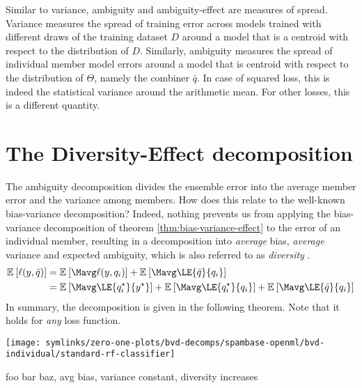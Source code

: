 \documentclass[../main.tex]{subfiles}
\begin{document}
Similar to variance, ambiguity and ambiguity-effect are measures of spread. 
Variance measures the spread of training error across models trained with different draws of the training dataset $D$ around a model that is a centroid with respect to the distribution of $D$. Similarly, ambiguity measures the spread of individual member model errors around a model that is centroid with respect to the distribution of $\Theta$, namely the combiner $\bar{q}$. In case of squared loss, this is indeed the statistical variance around the arithmetic mean. For other losses, this is a different quantity.



\section{The Diversity-Effect decomposition} \label{sec:bias-variance-diversity-decomp}

The ambiguity decomposition divides the ensemble error into the average member error and the variance among members. How does this relate to the well-known bias-variance decomposition? Indeed, nothing prevents us from applying the bias-variance decomposition of theorem \ref{thm:bias-variance-effect} to the error of an individual member, resulting in a decomposition into \textit{average} bias, \textit{average} variance and expected ambiguity, which is also referred to as \textit{diversity} \cite{wood23}.
$$
\begin{align}
\mathbb{E}_{}\left[ \ell(y, \bar{q} ) \right]  &=  
\mathbb{E}_{}\left[ \Mavg \ell(y, q_{i} ) \right]  
+  
\mathbb{E}_{}\left[ \Mavg \LE{\bar{q}}{q_{i}} \right]  \\
&= \mathbb{E}_{}\left[ \Mavg \LE{q_{i}^\star}{y^\star } \right]  + \mathbb{E}_{}\left[ \Mavg \LE{q_{i}^\star}{q_{i}} \right] + \mathbb{E}_{}\left[ \Mavg \LE{\bar{q}}{q_{i}} \right] 
\end{align}
$$
In summary, the decomposition is given in the following theorem. Note that it holds for \textit{any} loss function. 

\begin{marginfigure}
    \texttt{[image: symlinks/zero-one-plots/bvd-decomps/spambase-openml/bvd-individual/standard-rf-classifier]}
    \label{fig:spambase-standard-rf-classifier-bvd}
    \caption{
        foo bar baz, avg bias, variance constant, diversity increases
    }
\end{marginfigure}
\end{document}
